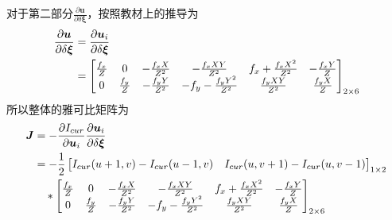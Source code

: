 \documentclass[40pt,a4paper，UTF8]{ctexart}
\numberwithin{equation}{section}
\begin{document}
\begin{enumerate}
对于第二部分$\frac{\partial \bm u}{\partial \delta \bm \xi}$，按照教材上的推导为
\begin{align}
\frac{\partial \bm u}{\partial \delta \bm \xi} &=
\frac{\partial \bm u_i}{\partial \delta \bm \xi} \notag \\
&=
\begin{bmatrix}
\frac{f_x}{Z} & 0 & -\frac{f_xX}{Z^2} & -\frac{f_xXY}{Z^2} & f_x+\frac{f_xX^2}{Z^2} & -\frac{f_xY}{Z} \\
0 & \frac{f_y}{Z} & -\frac{f_yY}{Z^2} & -f_y-\frac{f_yY^2}{Z^2} & \frac{f_yXY}{Z^2} & \frac{f_yX}{Z}
\end{bmatrix}_{2\times 6}
\end{align}
所以整体的雅可比矩阵为
\begin{align}
\bm J &= -\frac{\partial  I_{cur}}{\partial \bm u_i} \frac{\partial \bm u_i}{\partial \delta \bm \xi}  \notag \\
&=
-\frac{1}{2}\begin{bmatrix}
I_{cur}(u+1,v)-I_{cur}(u-1,v) & I_{cur}(u,v+1)-I_{cur}(u,v-1)
\end{bmatrix}_{1\times 2} \notag \\
& \quad *
\begin{bmatrix}
\frac{f_x}{Z} & 0 & -\frac{f_xX}{Z^2} & -\frac{f_xXY}{Z^2} & f_x+\frac{f_xX^2}{Z^2} & -\frac{f_xY}{Z} \\
0 & \frac{f_y}{Z} & -\frac{f_yY}{Z^2} & -f_y-\frac{f_yY^2}{Z^2} & \frac{f_yXY}{Z^2} & \frac{f_yX}{Z}
\end{bmatrix}_{2\times 6}
\end{align}
\end{enumerate}
\end{document}
